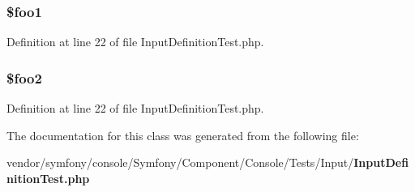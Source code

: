 \subsubsection[{\$foo1}]{\setlength{\rightskip}{0pt plus 5cm}\$foo1}\label{class_symfony_1_1_component_1_1_console_1_1_tests_1_1_input_1_1_input_definition_test_a64ddd2a1a786bf734c3dbce56860e0ba}


Definition at line 22 of file Input\+Definition\+Test.\+php.

\subsubsection[{\$foo2}]{\setlength{\rightskip}{0pt plus 5cm}\$foo2}\label{class_symfony_1_1_component_1_1_console_1_1_tests_1_1_input_1_1_input_definition_test_af6aa4bbf056a7264f7920e4bb9838486}


Definition at line 22 of file Input\+Definition\+Test.\+php.



The documentation for this class was generated from the following file\+:\begin{DoxyCompactItemize}
\item 
vendor/symfony/console/\+Symfony/\+Component/\+Console/\+Tests/\+Input/{\bf Input\+Definition\+Test.\+php}\end{DoxyCompactItemize}
